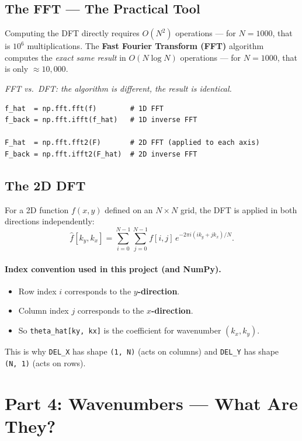 \documentclass[12pt,a4paper]{article}
\newcommand{\code}[1]{\texttt{#1}}
\theoremstyle{definition}
\begin{document}
\subsection{The FFT — The Practical Tool}

Computing the DFT directly requires $O(N^2)$ operations — for $N=1000$, that
is $10^6$ multiplications.  The \textbf{Fast Fourier Transform (FFT)} algorithm
computes the \emph{exact same result} in $O(N\log N)$ operations — for
$N=1000$, that is only $\approx 10{,}000$.

\medskip
\noindent\emph{FFT vs.\ DFT: the algorithm is different, the result is
identical.}

\begin{lstlisting}
f_hat  = np.fft.fft(f)        # 1D FFT
f_back = np.fft.ifft(f_hat)   # 1D inverse FFT

F_hat  = np.fft.fft2(F)       # 2D FFT (applied to each axis)
F_back = np.fft.ifft2(F_hat)  # 2D inverse FFT
\end{lstlisting}

\subsection{The 2D DFT}

For a 2D function $f(x,y)$ defined on an $N\times N$ grid, the DFT is applied
in both directions independently:
\begin{equation}
  \hat{f}[k_y,k_x]
  = \sum_{i=0}^{N-1}\sum_{j=0}^{N-1} f[i,j]\,e^{-2\pi i(ik_y+jk_x)/N}.
\end{equation}

\paragraph{Index convention used in this project (and NumPy).}
\begin{itemize}
  \item Row index $i$ corresponds to the \textbf{$y$-direction}.
  \item Column index $j$ corresponds to the \textbf{$x$-direction}.
  \item So \code{theta\_hat[ky, kx]} is the coefficient for wavenumber
    $(k_x, k_y)$.
\end{itemize}
This is why \code{DEL\_X} has shape \code{(1,~N)} (acts on columns) and
\code{DEL\_Y} has shape \code{(N,~1)} (acts on rows).

\section{Part 4: Wavenumbers — What Are They?}
\end{document}
